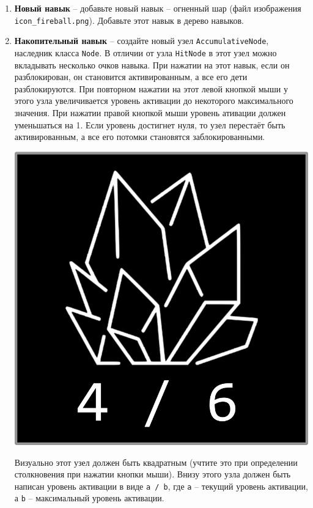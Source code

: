 \documentclass{article}
\begin{document}
\begin{enumerate}
\item \textbf{Новый навык} -- добавьте новый навык -- огненный шар (файл изображения \texttt{icon\_fireball.png}). Добавьте этот навык в дерево навыков.

\item \textbf{Накопительный навык} -- создайте новый узел \texttt{AccumulativeNode}, наследник класса \texttt{Node}. В отличии от узла \texttt{HitNode} в этот узел можно вкладывать несколько очков навыка.  При нажатии на этот навык, если он разблокирован, он становится активированным, а все его дети разблокируются. При повторном нажатии на этот левой кнопкой мыши у этого узла увеличивается уровень активации до некоторого максимального значения. При нажатии правой кнопкой мыши уровень ативации должен уменьшаться на 1. Если уровень достигнет нуля, то узел перестаёт быть активированным, а все его потомки становятся заблокированными.

\begin{center}
\includegraphics[scale=0.3]{images/freeze.png}
\end{center}

Визуально этот узел должен быть квадратным (учтите это при определении столкновения при нажатии кнопки мыши). Внизу этого узла должен быть написан уровень активации в виде \texttt{a / b}, где \texttt{a} -- текущий уровень активации, а \texttt{b} -- максимальный уровень активации.


\end{enumerate}
\end{document}
